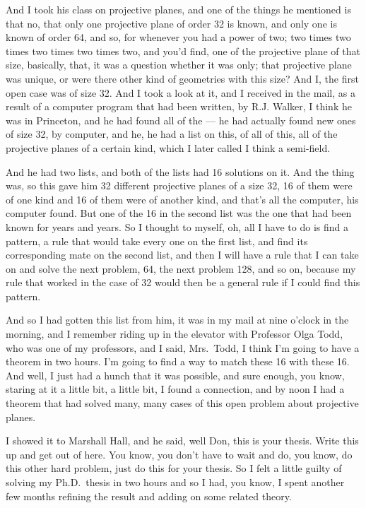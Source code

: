 \documentclass[]{article}
\begin{document}
And I took his class on projective planes, and one of the things he
mentioned is that no, that only one projective plane of order 32 is
known, and only one is known of order 64, and so, for whenever you had a
power of two; two times two times two times two times two, and you'd
find, one of the projective plane of that size, basically, that, it was
a question whether it was only; that projective plane was unique, or
were there other kind of geometries with this size? And I, the first
open case was of size 32. And I took a look at it, and I received in the
mail, as a result of a computer program that had been written, by R.J.
Walker, I think he was in Princeton, and he had found all of the --- he
had actually found new ones of size 32, by computer, and he, he had a
list on this, of all of this, all of the projective planes of a certain
kind, which I later called I think a semi-field.

And he had two lists, and both of the lists had 16 solutions on it. And
the thing was, so this gave him 32 different projective planes of a size
32, 16 of them were of one kind and 16 of them were of another kind, and
that's all the computer, his computer found. But one of the 16 in the
second list was the one that had been known for years and years. So I
thought to myself, oh, all I have to do is find a pattern, a rule that
would take every one on the first list, and find its corresponding mate
on the second list, and then I will have a rule that I can take on and
solve the next problem, 64, the next problem 128, and so on, because my
rule that worked in the case of 32 would then be a general rule if I
could find this pattern.

And so I had gotten this list from him, it was in my mail at nine
o'clock in the morning, and I remember riding up in the elevator with
Professor Olga Todd, who was one of my professors, and I said,
Mrs.~Todd, I think I'm going to have a theorem in two hours. I'm going
to find a way to match these 16 with these 16. And well, I just had a
hunch that it was possible, and sure enough, you know, staring at it a
little bit, a little bit, I found a connection, and by noon I had a
theorem that had solved many, many cases of this open problem about
projective planes.

I showed it to Marshall Hall, and he said, well Don, this is your
thesis. Write this up and get out of here. You know, you don't have to
wait and do, you know, do this other hard problem, just do this for your
thesis. So I felt a little guilty of solving my Ph.D.~thesis in two
hours and so I had, you know, I spent another few months refining the
result and adding on some related theory.
\end{document}
